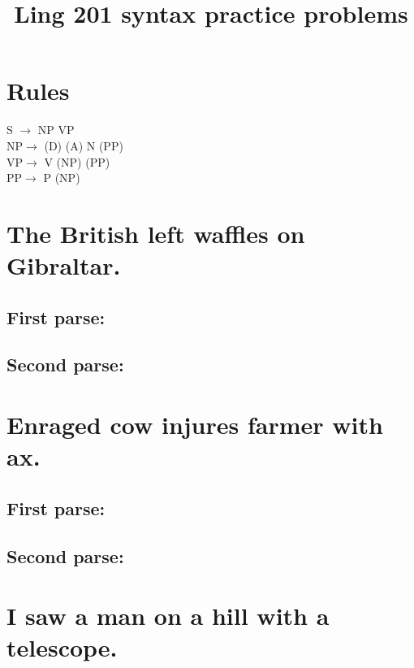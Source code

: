 \documentclass[12pt]{article}
\title{\vspace{-60pt}Ling 201 syntax practice problems}
\author{\vspace{-40pt}}
\date{\vspace{-60pt}}
\begin{document}
\maketitle

\section{Rules}

S $\rightarrow$ NP VP\\
NP$\rightarrow$ (D) (A) N (PP) \\
VP$\rightarrow$ V (NP) (PP) \\
PP$\rightarrow$ P (NP)

\section{The British left waffles on Gibraltar.}

\subsection*{First parse:}

\vspace{200pt}

\subsection*{Second parse:}

\pagebreak

\section{Enraged cow injures farmer with ax.}

\subsection*{First parse:}

\vspace{250pt}

\subsection*{Second parse:}

\pagebreak

\section{I saw a man on a hill with a telescope.}
\end{document}

